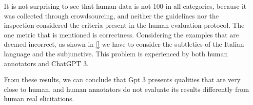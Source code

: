 It is not surprising to see that human data is not 100 in all categories, because it was collected through crowdsourcing, and neither the guidelines nor the inspection considered the criteria present in the human evaluation protocol. The one metric that is mentioned is correctness. Considering the examples that are deemed incorrect, as shown in \ref{} we have to consider the subtleties of the Italian language and the subjunctive. This problem is experienced by both human annotators and ChatGPT 3.

From these results, we can conclude that Gpt 3 presents qualities that are very close to human, and human annotators do not evaluate its results differently from human real elicitations. 

